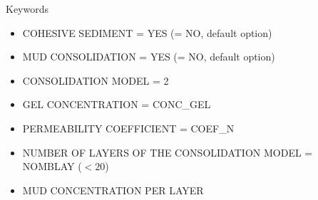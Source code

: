 \medskip
\begin{bclogo}[couleur=blue!10,arrondi=0.1, logo=\bcinfo]{Keywords}
\begin{itemize}
\item {\ttfamily COHESIVE SEDIMENT = YES} ({\ttfamily = NO}, default option)
\item {\ttfamily MUD CONSOLIDATION = YES} ({\ttfamily = NO}, default option)
\item {\ttfamily CONSOLIDATION MODEL = 2} 
\item {\ttfamily GEL CONCENTRATION = CONC\_GEL} 
\item {\ttfamily PERMEABILITY COEFFICIENT = COEF\_N} 
\item {\ttfamily NUMBER OF LAYERS OF THE CONSOLIDATION MODEL = NOMBLAY} ($<20$)
\item {\ttfamily MUD CONCENTRATION PER LAYER}
\end{itemize}
\end{bclogo}

\newpage

